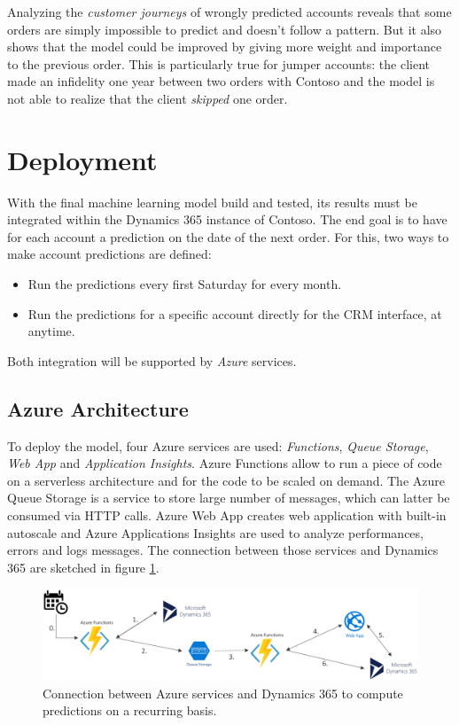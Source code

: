 Analyzing the \textit{customer journeys} of wrongly predicted accounts reveals that some orders are simply impossible to predict and doesn't follow a pattern. But it also shows that the model could be improved by giving more weight and importance to the previous order. This is particularly true for jumper accounts: the client made an infidelity one year between two orders with Contoso and the model is not able to realize that the client \textit{skipped} one order.

\section{Deployment} \label{sec:crm-deployment}
With the final machine learning model build and tested, its results must be integrated within the Dynamics 365 instance of Contoso. The end goal is to have for each account a prediction on the date of the next order. For this, two ways to make account predictions are defined:
\begin{itemize}
    \item Run the predictions every first Saturday for every month.
    \item Run the predictions for a specific account directly for the CRM interface, at anytime.
\end{itemize}

Both integration will be supported by \textit{Azure} services.

\subsection{Azure Architecture}
To deploy the model, four Azure services are used: \textit{Functions}, \textit{Queue Storage}, \textit{Web App} and \textit{Application Insights}. Azure Functions allow to run a piece of code on a serverless architecture and for the code to be scaled on demand. The Azure Queue Storage is a service to store large number of messages, which can latter be consumed via HTTP calls. Azure Web App creates web application with built-in autoscale and Azure Applications Insights are used to analyze performances, errors and logs messages. The connection between those services and Dynamics 365 are sketched in figure \ref{fig:azure-deployment}.

\begin{figure}[htbp]
    \centering
    \includegraphics[width=12cm]{images/azure-archi-weekly.png}
    \caption[Deployment architecture for scheduled predictions]{Connection between Azure services and Dynamics 365 to compute predictions on a recurring basis.}
    \label{fig:azure-deployment}
\end{figure}


